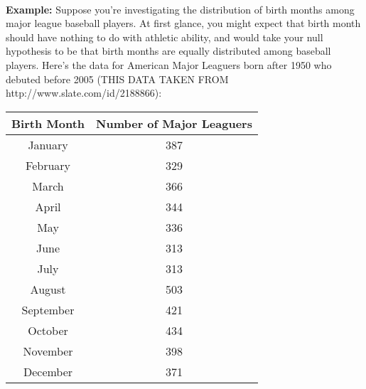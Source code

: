 ~



\textbf{Example:} Suppose \ex you're investigating the distribution of birth months among major league baseball players.  At first glance, you might expect that birth month should have nothing to do with athletic ability, and would take your null hypothesis to be that birth months are equally distributed among baseball players.  Here's the data for American Major Leaguers born after 1950 who debuted before 2005 (THIS DATA TAKEN FROM http://www.slate.com/id/2188866):



\begin{center} \label{tab:baseballbirthmonths}

\begin{tabular}{|c|c|}

\hline

Birth Month &Number of Major Leaguers\tabularnewline

\hline

\hline

January & 387\tabularnewline

\hline

February & 329\tabularnewline

\hline

March & 366\tabularnewline

\hline

April & 344\tabularnewline

\hline

May & 336\tabularnewline

\hline

June & 313\tabularnewline

\hline

July & 313\tabularnewline

\hline

August & 503\tabularnewline

\hline

September & 421\tabularnewline

\hline

October & 434\tabularnewline

\hline

November & 398\tabularnewline

\hline

December & 371\tabularnewline

\hline

\end{tabular}

\par\end{center}




